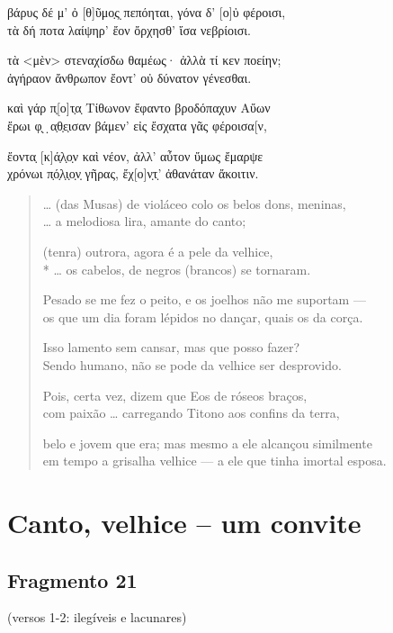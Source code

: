 {\begin{gkverse}
βάρυς δέ μ’ ὀ [θ]ῦμο̣ς ̣πεπόηται, γόνα δ’ [ο]ὐ φέροισι,\\
τὰ δή ποτα λαίψηρ’ ἔον ὄρχησθ’ ἴσα νεβρίοισι.

τὰ <μὲν> στεναχίσδω θαμέως· ἀλλὰ τί κεν ποείην;\\
ἀγήραον ἄνθρωπον ἔοντ’ οὐ δύνατον γένεσθαι.

καὶ γάρ π̣[ο]τ̣α̣ Τίθωνον ἔφαντο βροδόπαχυν Αὔων\\
ἔρωι φ̣ ̣ ̣α̣θ̣ε̣ισαν βάμεν’ εἰς ἔσχατα γᾶς φέροισα[ν,

ἔοντα̣ [κ]ά̣λ̣ο̣ν καὶ νέον, ἀλλ’ αὖτον ὔμως ἔμαρψε\\
χρόνωι π̣ό̣λ̣ι̣ο̣ν̣ γῆρας, ἔχ[ο]ν̣τ̣’ ἀθανάταν ἄκοιτιν.
\end{gkverse}

\begin{verse}
\ldots{} (das Musas) de violáceo colo os belos dons, meninas,\\
\ldots{} a melodiosa lira, amante do canto;

(tenra) outrora, agora é a pele da velhice,\\*
\ldots{} os cabelos, de negros (brancos) se tornaram.


Pesado se me fez o peito, e os joelhos não me suportam --- \\
os que um dia foram lépidos no dançar, quais os da corça.

Isso lamento sem cansar, mas que posso fazer?\\
Sendo humano, não se pode da velhice ser desprovido.

Pois, certa vez, dizem que Eos de róseos braços,\\
com paixão \ldots{} carregando Titono aos confins da terra,

belo e jovem que era; mas mesmo a ele alcançou similmente\\
em tempo a grisalha velhice --- a ele que tinha imortal esposa.
\end{verse}

\chapter{Canto, velhice -- um convite}


\section{Fragmento 21}

\begin{gkverse}
(versos 1-2: ilegíveis e lacunares)


\end{gkverse}}
